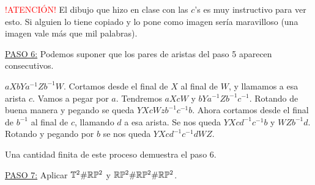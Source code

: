 {    \noindent \textcolor{red}{!ATENCIÓN!} El dibujo que hizo en clase con las $c$'s es muy instructivo para ver esto. Si alguien lo tiene copiado y lo pone como imagen sería maravilloso (una imagen vale más que mil palabras).

    \noindent \underline{PASO 6:} Podemos suponer que los pares de aristas del paso 5 aparecen consecutivos. 

    \noindent $aXbYa^{-1}Zb^{-1}W$. Cortamos desde el final de $X$ al final de $W$, y llamamos a esa arista $c$. Vamos a pegar por $a$. Tendremos $aXcW$ y $bYa^{-1}Zb^{-1}c^{-1}$. Rotando de buena manera y pegando se queda $YXcWzb^{-1}c^{-1}b$. Ahora cortamos desde el final de $b^{-1}$ al final de $c$, llamando $d$ a esa arista. Se nos queda $YXcd^{-1}c^{-1}b$ y $WZb^{-1}d$. Rotando y pegando por $b$ se nos queda $YXcd^{-1}c^{-1}dWZ$. 

    \noindent Una cantidad finita de este proceso demuestra el paso 6.

    \noindent \underline{PASO 7:} Aplicar $\mathbb{T}^2\#\mathbb{R} \mathbb{P}^2$ y $\mathbb{R} \mathbb{P}^2\#\mathbb{R} \mathbb{P}^2\#\mathbb{R} \mathbb{P}^2$.
}
